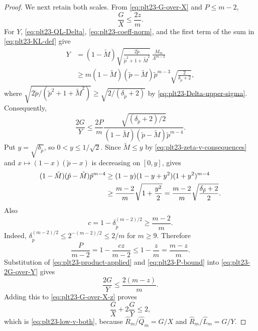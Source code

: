 ﻿\documentclass[11pt]{article}
\numberwithin{equation}{section}
\begin{document}
\begin{proof}
  We next retain both scales.
  From \eqref{eq:plt23-G-over-X} and $P\le m-2$,
  \begin{equation}\label{eq:plt23-G-over-X-z}
    \frac GX\le\frac{2z}{m}.
  \end{equation}
  For $Y$, \eqref{eq:plt23-QL-Delta}, \eqref{eq:plt23-coeff-norm}, and the first term of the sum in \eqref{eq:plt23-KL-def} give
  \begin{align*}
    Y
    &=(1-\tilde M)\sqrt{\frac{2\tilde p}{\tilde p^2+1+\tilde M^2}}\,
      \frac{M_m}{\Lambda^{m-2}}\\
    &\ge
    m(1-\tilde M)(\tilde p-\tilde M)\tilde p^{m-3}
    \sqrt{\frac2{\delta_{\tilde p}+2}},
  \end{align*}
  where $\sqrt{2\tilde p/(\tilde p^2+1+\tilde M^2)}\ge\sqrt{2/(\delta_{\tilde p}+2)}$ by \eqref{eq:plt23-Delta-upper-sigma}.
  Consequently,
  \begin{equation}\label{eq:plt23-2G-over-Y}
    \frac{2G}{Y}
    \le
    \frac{2P}{m}
    \frac{\sqrt{(\delta_{\tilde p}+2)/2}}
         {(1-\tilde M)(\tilde p-\tilde M)\tilde p^{m-4}}.
  \end{equation}
  Put $y=\sqrt{\delta_{\tilde p}}$, so $0<y\le1/\sqrt2$.
  Since $\tilde M\le y$ by \eqref{eq:plt23-zeta-v-consequences} and $x\mapsto(1-x)(\tilde p-x)$ is decreasing on $[0,y]$,  gives
  \begin{align}
   (1-\tilde M)(\tilde p-\tilde M)\tilde p^{m-4}
   &\ge
   (1-y)(1-y+y^2)(1+y^2)^{m-4}\notag\\
   &\ge
   \frac{m-2}{m}\sqrt{1+\frac{y^2}{2}}
   =\frac{m-2}{m}\sqrt{\frac{\delta_{\tilde p}+2}{2}}.
   \label{eq:plt23-product-applied}
  \end{align}
  Also
  \[
    c=1-\delta_{\tilde p}^{(m-2)/2}\ge\frac{m-2}{m}.
  \]
  Indeed, $\delta_{\tilde p}^{(m-2)/2}\le2^{-(m-2)/2}\le2/m$ for $m\ge9$.
  Therefore
  \begin{equation}\label{eq:plt23-P-bound}
    \frac P{m-2}=1-\frac{cz}{m-2}
    \le1-\frac{z}{m}
    =\frac{m-z}{m}.
  \end{equation}
  Substitution of \eqref{eq:plt23-product-applied} and \eqref{eq:plt23-P-bound} into \eqref{eq:plt23-2G-over-Y} gives
  \[
    \frac{2G}{Y}
    \le\frac{2(m-z)}{m}.
  \]
  Adding this to \eqref{eq:plt23-G-over-X-z} proves
  \[
    \frac GX+2\frac GY\le2,
  \]
  which is \eqref{eq:plt23-low-v-both}, because $\widehat R_m/\widehat Q_m=G/X$ and $\widehat R_m/\widehat L_m=G/Y$.
\end{proof}
\end{document}
